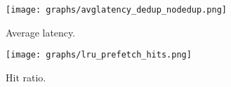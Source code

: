 \begin{figure}[t]
	\centering
	\begin{minipage}{0.225\textwidth}
		\centering
		\texttt{[image: graphs/avglatency\_dedup\_nodedup.png]}
		\caption{Average latency.}
		\label{fig:avg_latency_dedup_nodedup}
	\end{minipage}
	\begin{minipage}{0.225\textwidth}
		\centering
		\texttt{[image: graphs/lru\_prefetch\_hits.png]}
		\caption{Hit ratio.}
		\vspace{-3pt}
		\label{fig:lru_prefetching_hits}
	\end{minipage}
\end{figure}
